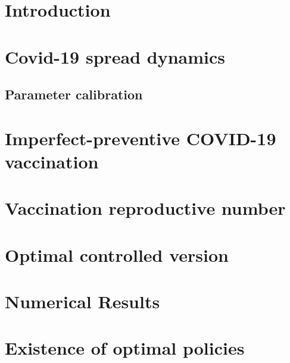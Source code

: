 \documentclass[sort&compress]{elsarticle}
\begin{document}
    \section{Introduction}
        
    \section{Covid-19 spread dynamics}
        
        \subsection{Parameter calibration}
            
    \section{Imperfect-preventive COVID-19 vaccination}
        
    \section{Vaccination reproductive number}
        
    \section{Optimal controlled version}
        
    \section{Numerical Results}
        
    \listofchanges[style=compactsummary]
    \appendix
  \section{Existence of optimal policies}
    
  
  
\end{document}

